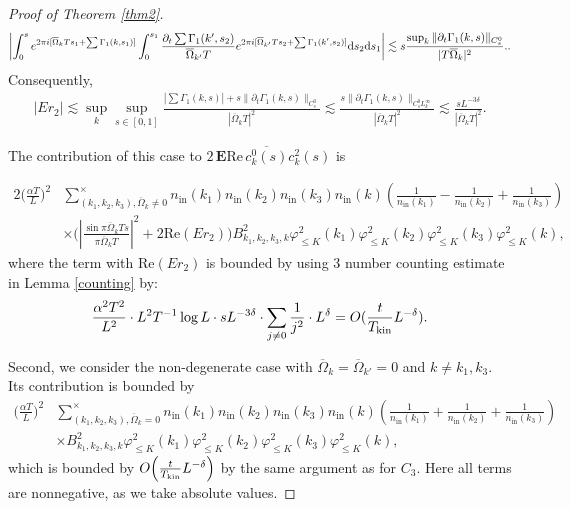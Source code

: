 \documentclass[UTF-8,reqno]{amsart}
\numberwithin{equation}{section}
\theoremstyle{definition}
\def\dif{{\mathord{{\rm d}}}}
\def\leq{\leqslant}
\def\dif{{\mathord{{\rm d}}}}
\def\leq{\leqslant}
\begin{document}
\begin{proof}[Proof of Theorem \ref{thm2}]
\begin{align*}
   \left| \int_0^se^{2\pi i[\overline \Omega_kTs_1+\sum\Gamma_1(k,s_1)]} \int_0^{s_1}\frac{\partial_t\sum\Gamma_1(k',s_2)}{\overline \Omega_{k'}T}e^{2\pi i[\overline \Omega_{k'}Ts_2+\sum\Gamma_1(k',s_2)]}\dif s_2 \dif s_1\right|\lesssim s\frac{\sup_k \|\partial_t\Gamma_1(k,s)\|_{C^0_s}}{|T\overline\Omega_k|^2}..
\end{align*}
Consequently,
 \begin{align*}
     | Er_2|\lesssim \sup_k\sup_{s\in[0,1]}\frac{|\sum\Gamma_1(k,s)|+s\|\partial_t\Gamma_1(k,s)\|_{C^0_s}}{|\overline \Omega_{k}T|^2}\lesssim \frac{ s \|\partial_t\Gamma_1(k,s)\|_{C^0_sL_k^\infty}}{|\overline \Omega_{k}T|^2}\lesssim \frac{ sL^{-3\delta}}{|\overline \Omega_{k}T|^2}.
 \end{align*}
 
The contribution of this case to $2\,\mathbf{E}\mathrm{Re}\,\overline{c^0_k(s)}c^2_k(s)$ is
 

\begin{align*}
2\bigg(\frac{\alpha T}{L}\bigg)^2&\sum\limits_{(k_1,k_2, k_{3}),\overline \Omega_k\neq  0}^{\times}n_{\mathrm{in}}(k_1)n_{\mathrm{in}}(k_2)n_{\mathrm{in}}(k_3)n_{\mathrm{in}}(k)\left(\frac{1}{n_{\mathrm{in}}(k_1)}-\frac{1}{n_{\mathrm{in}}(k_2)}+\frac{1}{n_{\mathrm{in}}(k_3)}\right)\\
&\times \Big(\left|\frac{\sin \pi \overline \Omega _kTs}{\pi\overline  \Omega _kT}\right|^2+2\mathrm{Re}(Er_2) \Big)
B^2_{k_1,k_2,k_3,k}\varphi_{\leq K}^2(k_1)\varphi_{\leq K}^2(k_2)\varphi_{\leq K}^2(k_3)\varphi_{\leq K}^2(k),
\end{align*}
where the term with $\mathrm{Re}(Er_2) $ is bounded by using 3 number counting estimate in Lemma \ref{counting} by:
\begin{align*}
    \frac{\alpha^2 T^2}{L^{2}}\cdot L^{2}T^{-1}\log L\cdot sL^{-3\delta}\cdot\sum_{j\neq 0}\frac{1}{j^2}\cdot L^\delta=O(\frac{t}{T_{\rm kin}}L^{-\delta}).
\end{align*}

Second, we consider the non-degenerate case with $\overline \Omega_k=\overline \Omega_{k'}=0$ and $k\neq k_1,k_3$. Its contribution is bounded by
\begin{align*}
\bigg(\frac{\alpha T}{L}\bigg)^2&\sum\limits_{(k_1,k_2, k_{3}),\overline \Omega_k= 0}^{\times}n_{\mathrm{in}}(k_1)n_{\mathrm{in}}(k_2)n_{\mathrm{in}}(k_3)n_{\mathrm{in}}(k)\left(\frac{1}{n_{\mathrm{in}}(k_1)}+\frac{1}{n_{\mathrm{in}}(k_2)}+\frac{1}{n_{\mathrm{in}}(k_3)}\right)\\
&\times 
B^2_{k_1,k_2,k_3,k}\varphi_{\leq K}^2(k_1)\varphi_{\leq K}^2(k_2)\varphi_{\leq K}^2(k_3)\varphi_{\leq K}^2(k),
\end{align*}
which is bounded by $O\!\left(\frac{t}{T_{\rm kin}}L^{-\delta}\right)$ by the same argument as for $C_3$. Here all terms are nonnegative, as we take absolute values. 


\end{proof}
\end{document}
